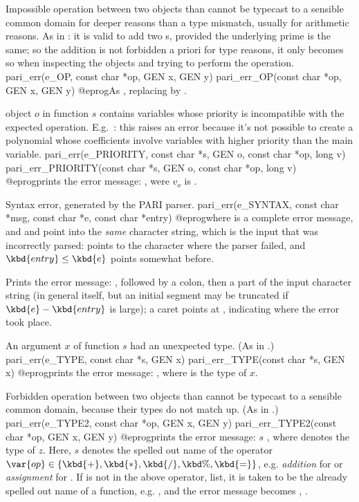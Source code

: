  Impossible operation between two objects than cannot be
typecast to a sensible common domain for deeper reasons than a type mismatch,
usually for arithmetic reasons. As in : it is valid to add
two s, provided the underlying prime is the same; so the addition
is not forbidden a priori for type reasons, it only becomes so when
inspecting the objects and trying to perform the operation.
\bprog
  pari_err(e_OP, const char *op, GEN x, GEN y)
  pari_err_OP(const char *op, GEN x, GEN y)
@eprog\noindent As , replacing  by
.

 object $o$ in function $s$ contains
variables whose priority is incompatible with the expected operation.
E.g.~: this raises an error because it's not possible to
create a polynomial whose coefficients involve variables with higher priority
than the main variable.
\bprog
  pari_err(e_PRIORITY, const char *s, GEN o, const char *op, long v)
  pari_err_PRIORITY(const char *s, GEN o, const char *op, long v)
@eprog\noindent prints the error message: , were $v_o$ is .

 Syntax error, generated by the PARI parser.
\bprog
  pari_err(e_SYNTAX, const char *msg, const char *e, const char *entry)
@eprog\noindent where  is a complete error message, and  and
 point into the \emph{same} character string, which is the input
that was incorrectly parsed:  points to the character where the parser
failed, and $\kbd{entry}\leq \kbd{e}$ points somewhat before.

\noindent Prints the error message: , followed by a colon, then
a part of the input character string (in general  itself, but an
initial segment may be truncated if $\kbd{e}-\kbd{entry}$ is large); a caret
points at , indicating where the error took place.

 An argument $x$ of function $s$ had an unexpected type.
(As in .)
\bprog
  pari_err(e_TYPE, const char *s, GEN x)
  pari_err_TYPE(const char *s, GEN x)
@eprog\noindent prints the error message: , where  is the type of $x$.

 Forbidden operation between two objects than cannot be
typecast to a sensible common domain, because their types do not match up.
(As in .)
\bprog
  pari_err(e_TYPE2, const char *op, GEN x, GEN y)
  pari_err_TYPE2(const char *op, GEN x, GEN y)
@eprog\noindent prints the error message:  $s$
  , where  denotes the type of $z$.
Here, $s$ denotes the spelled out name of the operator
$\var{op}\in\{\kbd{+}, \kbd{*}, \kbd{/}, \kbd{\%}, \kbd{=}\}$, e.g.
\emph{addition} for  or \emph{assignment} for . If 
is not in the above operator, list, it is taken to be the already spelled out
name of a function, e.g. , and the error message becomes
  , .

